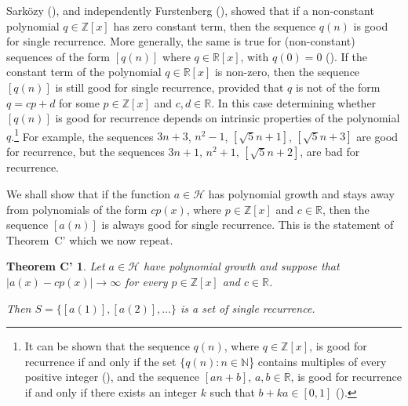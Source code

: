\documentclass[11pt]{amsart}
\renewcommand{\H}{\mathcal{H}}
\newcommand{\Q}{\mathbb{Q}}
\newcommand{\R}{\mathbb{R}}
\newcommand{\N}{\mathbb{N}}
\newcommand{\Z}{\mathbb{Z}}
\theoremstyle{plain}
\newtheorem{theorem}{Theorem}[section]
\newtheorem*{theoremC'}{Theorem C'}
\theoremstyle{definition}
\theoremstyle{remark}
\begin{document}
Sark\"ozy (\cite{Sa}), and independently Furstenberg (\cite{Fu2}),
showed that if a non-constant polynomial $q\in\Z[x]$ has zero constant term, then
the sequence $q(n)$ is good for single recurrence. More
generally, the same is true for (non-constant) sequences of the form
$[q(n)]$ where $q\in \R[x]$, with $q(0)=0$ (\cite{BH}).
 If the constant term of the polynomial $q\in \R[x]$ is non-zero, then the sequence
 $[q(n)]$ is still good for single recurrence, provided that
  $q$ is not of the form  $q=cp+d$ for some $p\in\Z[x]$ and $c,d\in \R$. In this case
  determining whether $[q(n)]$   is
good for recurrence depends on intrinsic properties of the polynomial
$q$.\footnote{It can be shown that the sequence $q(n)$, where $q\in
  \Z[x]$, is good for recurrence if and only if the set $\{q(n)\colon
  n\in\N$\} contains multiples of every positive integer (\cite{KM}),
  and the sequence $[an+b]$, $a,b\in\R$, is good for
  recurrence if and only if there exists an integer $k$ such that
  $b+ka\in [0,1]$ (\cite{BH}).} For example, the sequences
$3n+3$, $n^2-1$, $[\sqrt{5}n+1]$, $[\sqrt{5}n+3]$
are good for recurrence, but the sequences $3n+1$,
$n^2+1$, $[\sqrt{5}n+2]$,
are bad for recurrence.

We shall show that if the function $a\in \H$ has polynomial growth and stays away from
polynomials of the form $cp(x)$, where $p\in \Z[x]$ and $c\in\R$, then
the sequence $[a(n)]$ is always good for single recurrence. This is
the statement of Theorem~C' which we now repeat.





\begin{theoremC'}
  Let $a\in\H$ have  polynomial growth and suppose that  $|a(x)-cp(x)|\to \infty $ for every $p\in
  \Z[x]$ and
  $c\in \R$.

  Then $S=\{[a(1)],[a(2)],\ldots\}$ is a set of single
  recurrence.
\end{theoremC'}
\end{document}

